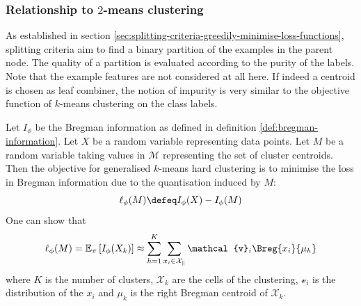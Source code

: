 \documentclass[../main.tex]{subfiles}
\begin{document}




\subsubsection{Relationship to $2$-means clustering}



As established in section \ref{sec:splitting-criteria-greedily-minimise-loss-functions}, splitting criteria aim to find a binary partition of the examples in the parent node. The quality of a partition is evaluated according to the purity of the labels. Note that the example features are not considered at all here. If indeed a centroid is chosen as leaf combiner, the notion of impurity is very similar to the objective function of $k$-means clustering on the class labels.

Let $I_{\phi}$ be the Bregman information as defined in definition \ref{def:bregman-information}. Let $X$ be a random variable representing data points. Let $M$ be a random variable taking values in $\mathcal{M}$ representing the set of cluster centroids. Then the objective for generalised $k$-means hard clustering \cite{banerjee_ClusteringBregmanDivergences_2004} is to minimise the loss in Bregman information due to the quantisation induced by $M$:
$$
 \ell_{\phi}(M) \defeq I_{\phi}(X) - I_{\phi}(M)
$$
One can show \cite{banerjee_ClusteringBregmanDivergences_2004} that
$$
\ell_{\phi}(M) = \mathbb{E}_{\pi}\left[ I_{\phi}(X_{k}) \right]  \approx \sum_{h=1}^K \sum_{x_{i} \in \mathcal{X_{k}}} \mathcal{v}_{i} \Breg{x_{i}}{\mu_{h}}
$$
where $K$ is the number of clusters, $\mathcal{X}_{k}$ are the cells of the clustering, $\mathcal{v}_{i}$ is the distribution of the $x_{i}$ and $\mu_{k}$ is the right Bregman centroid of $\mathcal{X}_{k}$.
\end{document}
